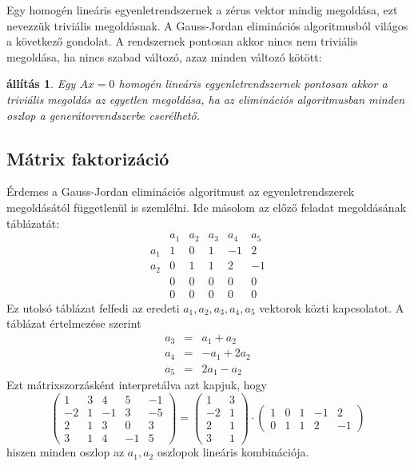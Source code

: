 \documentclass[9pt, a4paper, showtrims]{memoir}
\theoremstyle{plain}
\newtheorem{proposition}{állítás}[chapter]
\theoremstyle{remark}
\theoremstyle{definition}
\begin{document}
Egy homogén lineáris egyenletrendszernek a zérus vektor mindig megoldása,
ezt nevezzük triviális megoldásnak.
A Gauss-Jordan eliminációs  algoritmusból világos a következő gondolat.
A rendszernek pontosan akkor nincs nem triviális megoldása, 
ha nincs szabad változó, azaz minden változó kötött:
\begin{proposition}
    Egy $Ax=0$ homogén lineáris egyenletrendszernek pontosan akkor a triviális megoldás az egyetlen megoldása, 
    ha az eliminációs algoritmusban minden oszlop a generátorrendszerbe cserélhető.
\end{proposition}
\subsection{Mátrix faktorizáció}
Érdemes a Gauss-Jordan eliminációs  algoritmust az egyenletrendszerek megoldásától függetlenül is szemlélni.
Ide másolom az előző feladat megoldásának táblázatát:
\[
    \begin{array}{r|rrrrr}
        &a_1&a_2&a_3&a_4&a_5\\
        \hline
        a_1&1&0&1&-1&2\\
        a_2&0&1&1&2&-1\\
        &0&0&0&0&0\\
        &0&0&0&0&0
    \end{array}
\]
Ez utolsó táblázat felfedi az eredeti $a_1,a_2,a_3,a_4,a_5$ vektorok közti kapcsolatot.
A táblázat értelmezése szerint
\begin{eqnarray*}
    a_3&=& a_1+a_2\\
    a_4&=& -a_1+2a_2\\
    a_5&=& 2a_1-a_2
\end{eqnarray*}
Ezt mátrixszorzásként interpretálva azt kapjuk, hogy
\[
    \begin{pmatrix}
        1&3&4&5&-1\\
        -2&1&-1&3&-5\\
        2&1&3&0&3\\
        3&1&4&-1&5
    \end{pmatrix}
    =
    \begin{pmatrix}
        1&3\\
        -2&1\\
        2&1\\
        3&1
    \end{pmatrix}
    \cdot
    \begin{pmatrix}
        1&0&1&-1&2\\
        0&1&1&2&-1
    \end{pmatrix}
\]
hiszen minden oszlop az $a_1,a_2$ oszlopok lineáris kombinációja.
\end{document}
